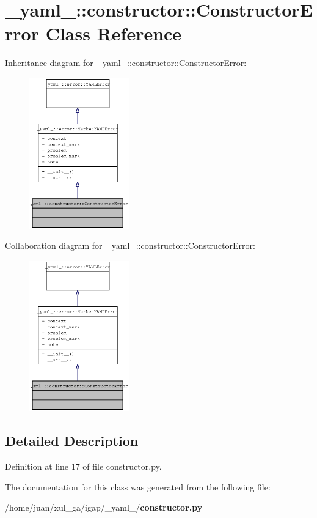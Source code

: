 \section{\_\-yaml\_\-::constructor::ConstructorError Class Reference}
\label{class__yaml___1_1constructor_1_1ConstructorError}
Inheritance diagram for \_\-yaml\_\-::constructor::ConstructorError:\nopagebreak
\begin{figure}[H]
\begin{center}
\leavevmode
\includegraphics[width=122pt]{class__yaml___1_1constructor_1_1ConstructorError__inherit__graph}
\end{center}
\end{figure}
Collaboration diagram for \_\-yaml\_\-::constructor::ConstructorError:\nopagebreak
\begin{figure}[H]
\begin{center}
\leavevmode
\includegraphics[width=122pt]{class__yaml___1_1constructor_1_1ConstructorError__coll__graph}
\end{center}
\end{figure}


\subsection{Detailed Description}


Definition at line 17 of file constructor.py.

The documentation for this class was generated from the following file:\begin{CompactItemize}
\item 
/home/juan/xul\_\-ga/igap/\_\-yaml\_\-/{\bf constructor.py}\end{CompactItemize}

